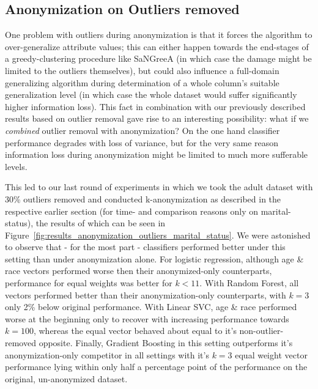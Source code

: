 \documentclass{llncs}
\begin{document}
\subsection{Anonymization on Outliers removed}
\label{ssect:anon_outliers_removed}

One problem with outliers during anonymization is that it forces the algorithm to over-generalize attribute values; this can either happen towards the end-stages of a greedy-clustering procedure like SaNGreeA (in which case the damage might be limited to the outliers themselves), but could also influence a full-domain generalizing algorithm during determination of a whole column's suitable generalization level (in which case the whole dataset would suffer significantly higher information loss). This fact in combination with our previously described results based on outlier removal gave rise to an interesting possibility: what if we \textit{combined} outlier removal with anonymization? On the one hand classifier performance degrades with loss of variance, but for the very same reason information loss during anonymization might be limited to much more sufferable levels.

This led to our last round of experiments in which we took the adult dataset with 30\% outliers removed and conducted k-anonymization as described in the respective earlier section (for time- and comparison reasons only on marital-status), the results of which can be seen in Figure~\ref{fig:results_anonymization_outliers_marital_status}. We were astonished to observe that - for the most part - classifiers performed better under this setting than under anonymization alone. For logistic regression, although age \& race vectors performed worse then their anonymized-only counterparts, performance for equal weights was better for $k<11$. With Random Forest, all vectors performed better than their anonymization-only counterparts, with $k=3$ only 2\% below original performance. With Linear SVC, age \& race performed worse at the beginning only to recover with increasing performance towards $k=100$, whereas the equal vector behaved about equal to it's non-outlier-removed opposite. Finally, Gradient Boosting in this setting outperforms it's anonymization-only competitor in all settings with it's $k=3$ equal weight vector performance lying within only half a percentage point of the performance on the original, un-anonymized dataset.
\end{document}
